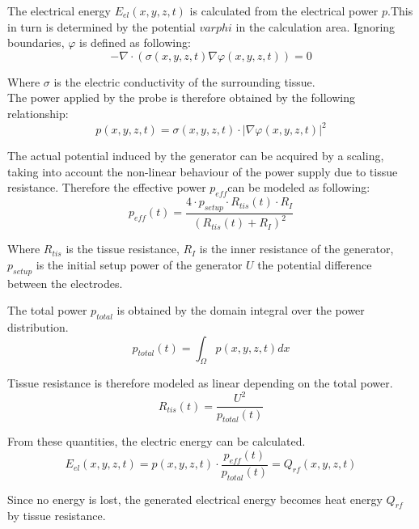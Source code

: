 \documentclass[parskip=half, titlepage=yes, 12pt, BCOR=12mm, DIV=calc]{scrartcl}
\begin{document}
The electrical energy $E_{el}(x,y,z,t)$ is calculated from the electrical power $p$.This in turn is determined by the potential $varphi$ in the calculation area. Ignoring boundaries, $\varphi$ is defined as following:
\begin{equation}
    - \nabla \cdot (\sigma(x,y,z,t) \nabla \varphi(x,y,z,t)) = 0
\end{equation}

Where $\sigma$ is the electric conductivity of the surrounding tissue. \\
The power applied by the probe is therefore obtained by the following relationship:
\begin{equation}
    p(x,y,z,t) = \sigma(x,y,z,t) \cdot |\nabla \varphi(x,y,z,t)|^2
\end{equation}

The actual potential induced by the generator can be acquired by a scaling, taking into account the non-linear behaviour of the power supply due to tissue resistance. Therefore the effective power $p_{eff} $can be modeled as following:   
\begin{equation}
    p_{eff}(t) = \frac{4 \cdot p_{setup} \cdot R_{tis}(t) \cdot R_I}{(R_{tis}(t) + R_I)^2}
\end{equation}

Where $R_{tis}$ is the tissue resistance, $R_I$ is the inner resistance of the generator, $p_{setup}$ is the initial setup power of the generator $U$ the potential difference between the electrodes.

The total power $p_{total}$ is obtained by the domain integral over the power distribution.
\begin{equation}
    p_{total}(t) = \int_{\Omega} p(x,y,z,t) dx
\end{equation}

Tissue resistance is therefore modeled as linear depending on the total power.
\begin{equation}
    R_{tis}(t) = \frac{U^2}{p_{total}(t)}
\end{equation}

From these quantities, the electric energy can be calculated.
\begin{equation}
   E_{el}(x,y,z,t) = p(x,y,z,t) \cdot \frac{p_{eff}(t)}{p_{total}(t)} = Q_{rf}(x,y,z,t)
   \label{eq:q_rfa}
\end{equation}


Since no energy is lost, the generated electrical energy becomes heat energy $Q_{rf}$ by tissue resistance. \\
\end{document}
